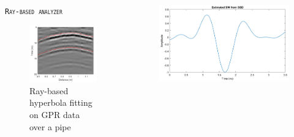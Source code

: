 \documentclass[final]{beamer}
\newlength{\onecolwid}
\newlength{\twocolwid}
\begin{document}
\begin{frame}[t]
\begin{columns}[t]
\begin{column}{\twocolwid}
\begin{columns}[t,totalwidth=\twocolwid]
\begin{column}{\onecolwid}
\begin{block}{\textsc{\texttt{Ray-based analyzer}}}
\begin{figure}
	\includegraphics[width=0.7\linewidth]{ray-based.png}
	\caption{Ray-based hyperbola fitting on GPR data over a pipe \cite{jazayeri2017}}
\end{figure}

\end{block}


\end{column} %

\begin{column}{\onecolwid} %

\vspace{-2cm}
\begin{block}{}%
\begin{figure}
	\includegraphics[width=0.4\linewidth]{SBD_pipe_sw.png}
	

\end{figure}
\end{block}
\end{column}
\end{columns}
\end{column}
\end{columns}
\end{frame}
\end{document}
